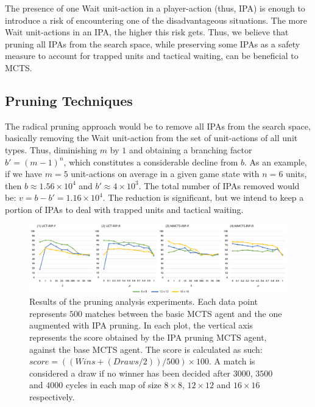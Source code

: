 \documentclass[conference]{IEEEtran}
\begin{document}
The presence of one Wait unit-action in a player-action (thus, IPA) is enough to introduce a risk of encountering one of the disadvantageous situations. The more Wait unit-actions in an IPA, the higher this risk gets. Thus, we believe that pruning all IPAs from the search space, while preserving some IPAs as a safety measure to account for trapped units and tactical waiting, can be beneficial to MCTS.



\subsection{Pruning Techniques}

The radical pruning approach would be to remove all IPAs from the search space, basically removing the Wait unit-action from the set of unit-actions of all unit types. Thus, diminishing $m$ by $1$ and obtaining a branching factor $b' = (m - 1)^n$, which constitutes a considerable decline from $b$. As an example, if we have $m=5$ unit-actions on average in a given game state with $n=6$ units, then $b \approx 1.56\times10^4$ and $b' \approx 4\times10^3$. The total number of IPAs removed would be: $v = b - b' = 1.16\times10^4$. The reduction is significant, but we intend to keep a portion of IPAs to deal with trapped units and tactical waiting.

\begin{figure}[!h]
\begin{center}
	\includegraphics[width=1\textwidth]{figs/PT-h.pdf}
	\caption{Results of the pruning analysis experiments. Each data point represents $500$ matches between the basic MCTS agent and the one augmented with IPA pruning. In each plot, the vertical axis represents the score obtained by the IPA pruning MCTS agent, against the base MCTS agent. The score is calculated as such: $score = ((Wins + (Draws / 2)) / 500) \times 100$. A match is considered a draw if no winner has been decided after $3000$, $3500$ and $4000$ cycles in each map of size $8\times8$, $12\times12$ and $16\times16$ respectively.}
	\label{PruningAnalysis}
\end{center}
\end{figure}
\end{document}
